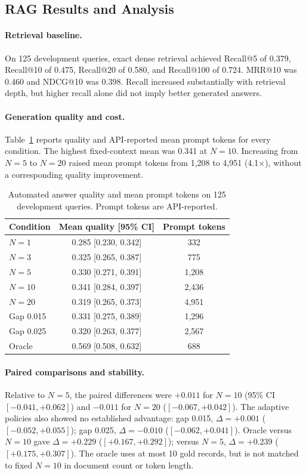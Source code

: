 \subsection{RAG Results and Analysis}
\label{sec:rag_results}

\paragraph{Retrieval baseline.}
On 125 development queries, exact dense
retrieval achieved Recall@5 of 0.379,
Recall@10 of 0.475, Recall@20 of 0.580,
and Recall@100 of 0.724. MRR@10 was
0.460 and NDCG@10 was 0.398.
Recall increased substantially with
retrieval depth, but higher recall alone
did not imply better generated answers.

\paragraph{Generation quality and cost.}
Table~\ref{tab:rag_context} reports
quality and API-reported mean prompt tokens
for every condition. The highest fixed-context
mean was 0.341 at $N=10$. Increasing from
$N=5$ to $N=20$ raised mean prompt tokens
from 1,208 to 4,951 (4.1$\times$), without
a corresponding quality improvement.

\begin{table}[!htbp]
\centering
\caption{Automated answer quality and mean
prompt tokens on 125 development queries.
Prompt tokens are API-reported.}
\label{tab:rag_context}
\small
\begin{tabular}{lcc}
\hline
Condition & Mean quality [95\% CI] & Prompt tokens \\
\hline
$N=1$       & 0.285 [0.230, 0.342] & 332 \\
$N=3$       & 0.325 [0.265, 0.387] & 775 \\
$N=5$       & 0.330 [0.271, 0.391] & 1,208 \\
$N=10$      & 0.341 [0.284, 0.397] & 2,436 \\
$N=20$      & 0.319 [0.265, 0.373] & 4,951 \\
Gap 0.015   & 0.331 [0.275, 0.389] & 1,296 \\
Gap 0.025   & 0.320 [0.263, 0.377] & 2,567 \\
Oracle      & 0.569 [0.508, 0.632] & 688 \\
\hline
\end{tabular}
\end{table}

\paragraph{Paired comparisons and stability.}
Relative to $N=5$, the paired differences were
$+0.011$ for $N=10$
(95\% CI $[-0.041,+0.062]$) and $-0.011$
for $N=20$ ($[-0.067,+0.042]$). The adaptive
policies also showed no established advantage:
gap 0.015, $\Delta=+0.001$
($[-0.052,+0.055]$); gap 0.025,
$\Delta=-0.010$ ($[-0.062,+0.041]$).
Oracle versus $N=10$ gave $\Delta=+0.229$
($[+0.167,+0.292]$); versus $N=5$,
$\Delta=+0.239$ ($[+0.175,+0.307]$).
The oracle uses at most 10 gold records, but
is not matched to fixed $N=10$ in document
count or token length.

